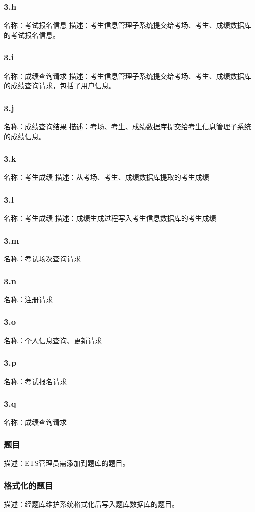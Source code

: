 \subsubsection{3.h}
名称：考试报名信息
描述：考生信息管理子系统提交给考场、考生、成绩数据库的考试报名信息。
\subsubsection{3.i}
名称：成绩查询请求
描述：考生信息管理子系统提交给考场、考生、成绩数据库的成绩查询请求，包括了用户信息。
\subsubsection{3.j}
名称：成绩查询结果
描述：考场、考生、成绩数据库提交给考生信息管理子系统的成绩信息。
\subsubsection{3.k}
名称：考生成绩
描述：从考场、考生、成绩数据库提取的考生成绩
\subsubsection{3.l}
名称：考生成绩
描述：成绩生成过程写入考生信息数据库的考生成绩
\subsubsection{3.m}
名称：考试场次查询请求
\subsubsection{3.n}
名称：注册请求
\subsubsection{3.o}
名称：个人信息查询、更新请求
\subsubsection{3.p}
名称：考试报名请求
\subsubsection{3.q}
名称：成绩查询请求
\subsubsection{题目}
描述：ETS管理员需添加到题库的题目。
\subsubsection{格式化的题目}
描述：经题库维护系统格式化后写入题库数据库的题目。
